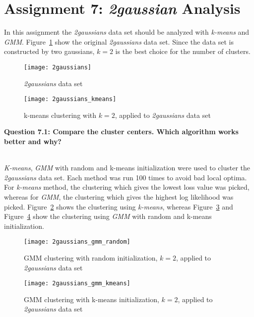 \pagebreak[4]
\section{Assignment 7: \textit{2gaussian} Analysis}
\label{assignment7}

In this assignment the \textit{2gaussians} data set should be analyzed with \textit{k-means} and \textit{GMM}. Figure~\ref{fig:2gaussians} show the original \textit{2gaussians} data set. Since the data set is constructed by two gaussians, $k=2$ is the best choice for the number of clusters.

\begin{figure}[h!]
	\centering
	\texttt{[image: 2gaussians]}
	\caption{\textit{2gaussians} data set}
	\label{fig:2gaussians}
\end{figure}

\begin{figure}[h!]
	\centering
	\texttt{[image: 2gaussians\_kmeans]}
	\caption{k-means clustering with $k=2$, applied to \textit{2gaussians} data set}
	\label{fig:2gaussians_kmeans}
\end{figure}

\newpage

{\raggedright \textbf{Question 7.1: Compare the cluster centers. Which algorithm works better and why?}}\\

\textit{K-means}, \textit{GMM} with random and k-means initialization were used to cluster the \textit{2gaussians} data set. Each method was run 100 times to avoid bad local optima. For \textit{k-means} method, the clustering which gives the lowest loss value was picked, whereas for \textit{GMM}, the clustering which gives the highest log likelihood was picked. Figure~\ref{fig:2gaussians_kmeans} shows the clustering using \textit{k-means}, whereas Figure~\ref{fig:2gaussians_gmm_random} and Figure~\ref{fig:2gaussians_gmm_kmeans} show the clustering using \textit{GMM} with random and k-means initialization.


\begin{figure}[h!]
	\centering
	\texttt{[image: 2gaussians\_gmm\_random]}
	\caption{GMM clustering with random initialization, $k=2$, applied to \textit{2gaussians} data set}
	\label{fig:2gaussians_gmm_random}
\end{figure}

\begin{figure}[h!]
	\centering
	\texttt{[image: 2gaussians\_gmm\_kmeans]}
	\caption{GMM clustering with k-means initialization, $k=2$, applied to \textit{2gaussians} data set}
	\label{fig:2gaussians_gmm_kmeans}
\end{figure}

